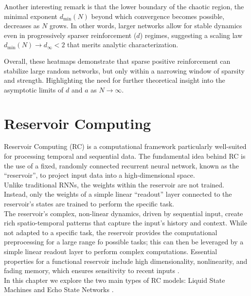 \documentclass[a4paper,12pt]{report}
\begin{document}
Another interesting remark is that the lower boundary of the 
chaotic region, the minimal exponent \(d_{\min}(N)\) beyond which 
convergence becomes possible, decreases as \(N\) grows. 
In other words, larger networks allow for stable dynamics even in 
progressively sparser reinforcement (\(d\)) regimes, suggesting a scaling 
law \(d_{\min}(N)\to d_\infty<2\) that merits analytic characterization.
\vspace{0.5em}

Overall, these heatmaps demonstrate that sparse positive reinforcement 
can stabilize large random networks, but only within a narrowing 
window of sparsity and strength. Highlighting the need for further 
theoretical insight into the asymptotic limits of \(d\) and \(a\) 
as \(N\to\infty\).  






\chapter{Reservoir Computing}
Reservoir Computing (RC) is a computational framework particularly well-suited for 
processing temporal and sequential data. The fundamental idea behind RC is the use of a 
fixed, randomly connected recurrent neural network, known as the ``reservoir'', to 
project input data into a high-dimensional space. \\
Unlike traditional RNNs, the weights within the reservoir are not trained. Instead, 
only the weights of a simple linear ``readout'' layer connected to the reservoir's states 
are trained to perform the specific task.\\
The reservoir's complex, non-linear dynamics, driven by sequential input, create rich 
spatio-temporal patterns that capture the input's history and context. While not adapted 
to a specific task, the reservoir provides the computational preprocessing for a large
range fo possible tasks; this can then be leveraged by a simple linear readout layer to 
perform complex computations. 
Essential properties for a functional reservoir include high dimensionality, nonlinearity, 
and fading memory, which ensures sensitivity to recent inputs \cite{TANAKA2019100}.\\
In this chapter we explore the two main types of RC models: Liquid State Machines
\cite{Maass2002} and Echo State Networks \cite{Jaeger2001}.
\end{document}

